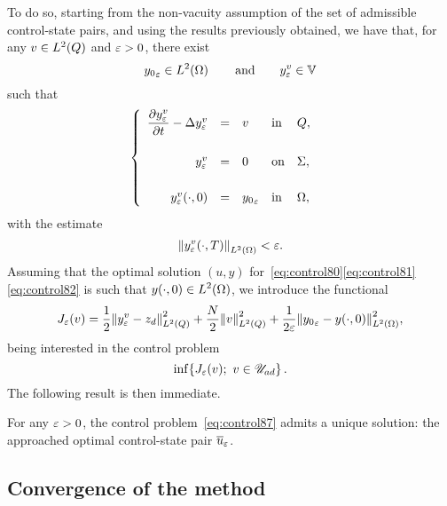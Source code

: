 To do so, starting from the non-vacuity assumption of the set of admissible
control-state pairs, and using the results previously obtained, we have
that, for any $v\in L^{2}\!\left({Q}\right)$ and $\varepsilon > 0$, there exist
\begin{equation*}
    {y_{0}}_{\varepsilon}\in L^{2}\!\left({\Omega}\right)\qquad\text{and}\qquad y_{\varepsilon}^{v}\in
    \mathbb{V}
\end{equation*}
such that
\begin{equation*}
    \begin{cases}\displaystyle
        \begin{array}{rclll}
            \dfrac{\partial{}y_{\varepsilon}^{v}}{\partial{}t} - \Delta y_{\varepsilon}^{v} & = & v &
            \text{in} & Q,\\
            \\
            y_{\varepsilon}^{v} & = & 0 & \text{on} & \Sigma,\\
            \\
            {y_{\varepsilon}^{v}}\!\left({\cdot, 0}\right) & = & {y_{0}}_{\varepsilon} &
            \text{in} & \Omega,
        \end{array}
    \end{cases}
\end{equation*}
with the estimate
\begin{equation*}
    \normeohm{%
        \condfinale{y_{\veps}^{v}}
    } < \veps.
\end{equation*}
Assuming that the optimal solution $(u,y)$
for~\eqref{eq:control80}\eqref{eq:control81}\eqref{eq:control82} is such
that $\displaystyle {y}\!\left({\cdot, 0}\right)\in L^{2}\!\left({\Omega}\right)$, we introduce the
functional
\begin{equation*}
    J_{\varepsilon}(v) = \dfrac{1}{2}{\left\|{y_{\varepsilon}^{v} - z_{d} }\right\|}_{L^{2}\left({Q}\right)}^{2} +
    \dfrac{N}{2}{\left\|{v }\right\|}_{L^{2}\left({Q}\right)}^{2} + \dfrac{1}{2\varepsilon}{\left\|{{y_{0}}_{\varepsilon} -
    {y}\!\left({\cdot, 0}\right) }\right\|}_{L^{2}\left({\Omega}\right)}^{2},
\end{equation*}
being interested in the control problem
\begin{equation}\label{eq:control87}
    \inf\!\left\{{%
        J_{\veps}(v);\ v\in\uad
    }\right\}.
\end{equation}
The following result is then immediate.

\begin{proposition}%
    For any $\varepsilon > 0$, the control problem~\eqref{eq:control87} admits a
    unique solution: the approached optimal control-state pair ${\overline{u}}_{\varepsilon}$.
\end{proposition}

\subsection{Convergence of the method}\label{sec:convergence}

